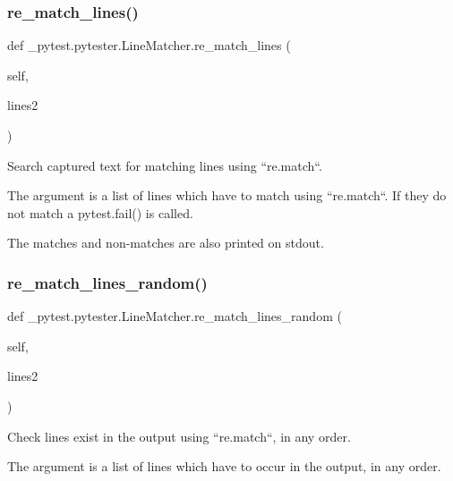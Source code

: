 \subsubsection{\texorpdfstring{re\+\_\+match\+\_\+lines()}{re\_match\_lines()}}
{\footnotesize\ttfamily def \+\_\+pytest.\+pytester.\+Line\+Matcher.\+re\+\_\+match\+\_\+lines (\begin{DoxyParamCaption}\item[{}]{self,  }\item[{}]{lines2 }\end{DoxyParamCaption})}

\begin{DoxyVerb}Search captured text for matching lines using ``re.match``.

The argument is a list of lines which have to match using ``re.match``.
If they do not match a pytest.fail() is called.

The matches and non-matches are also printed on stdout.\end{DoxyVerb}
 \mbox{\label{class__pytest_1_1pytester_1_1_line_matcher_a7cb3221f2ab7309da2342bb23257fc46}} 
\subsubsection{\texorpdfstring{re\+\_\+match\+\_\+lines\+\_\+random()}{re\_match\_lines\_random()}}
{\footnotesize\ttfamily def \+\_\+pytest.\+pytester.\+Line\+Matcher.\+re\+\_\+match\+\_\+lines\+\_\+random (\begin{DoxyParamCaption}\item[{}]{self,  }\item[{}]{lines2 }\end{DoxyParamCaption})}

\begin{DoxyVerb}Check lines exist in the output using ``re.match``, in any order.

The argument is a list of lines which have to occur in the output, in
any order.\end{DoxyVerb}
 \mbox{\label{class__pytest_1_1pytester_1_1_line_matcher_ad1ec0a52963a0ebf982d5a2ff1e8856b}} 

